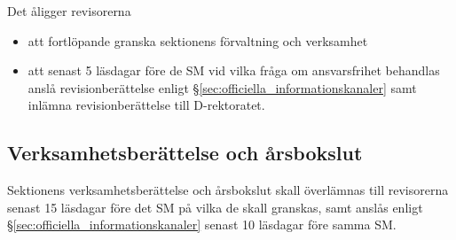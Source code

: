 \documentclass{dgovdoc}
\begin{document}
Det åligger revisorerna

\begin{itemize}
  \item att fortlöpande granska sektionens förvaltning och verksamhet
  \item att senast 5 läsdagar före de SM vid vilka fråga om ansvarsfrihet
    behandlas anslå revisionberättelse enligt
    \S\ref{sec:officiella_informationskanaler} samt inlämna revisionberättelse
    till D-rektoratet.
\end{itemize}

\subsection{Verksamhetsberättelse och årsbokslut}

Sektionens verksamhetsberättelse och årsbokslut skall överlämnas till
revisorerna senast 15 läsdagar före det SM på vilka de skall granskas, samt
anslås enligt \S\ref{sec:officiella_informationskanaler} senast 10 läsdagar före
samma SM.
\end{document}
